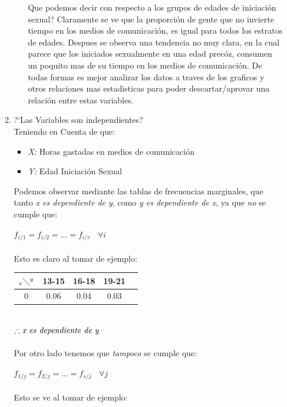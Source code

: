 \documentclass[letterpaper,spanish,11pt]{article}
\begin{document}
\begin{itemize}
\begin{enumerate}
\begin{enumerate}
Que podemos decir con respecto a los grupos de edades de iniciaci\'on sexual? Claramente se ve que la proporci\'on de gente que no invierte tiempo en los medios de comunicaci\'on, es igual para todos los estratos de edades. Despues se observa una tendencia no muy clara, en la cual parece que los iniciados sexualmente en una edad prec\'oz, consumen un poquito mas de su tiempo en los medios de comunicaci\'on. De todas formas es mejor analizar los datos a traves de los graficos y otros relaciones mas estadisticas para poder descartar/aprovar una relaci\'on entre estas variables.

\end{enumerate}

\item ?`Las Variables son independientes?\\
	Teniendo en Cuenta de que:\\
	\begin{itemize}
		\item \emph{X:} Horas gastadas en medios de comunicaci\'on
		\item \emph{Y:} Edad Iniciaci\'on Sexual
	\end{itemize}
	Podemos observar mediante las tablas de frecuencias marginales, que tanto \emph{x es dependiente de y}, como \emph{y es dependiente de x}, ya que \emph{no} se cumple que:

	$f_{i/1} = f_{i/2} = ... = f_{i/r} \ \ \ \ \forall i $\\ \\
	Esto es claro al tomar de ejemplo: \\
	
	\begin{tabular}[c]{|c|c c c|c|}                           	
	\hline
	$_x\diagdown ^{y}$ & 13-15 & 16-18 & 19-21 \\
	\hline
	0 & 0.06 & 0.04 & 0.03 \\
	\hline
	\end{tabular} \\

	$\therefore \emph{x es dependiente de y}$ \\ \\
	Por otro lado tenemos que \emph{tampoco} se cumple que:

 	$f_{1/j} = f_{2/j} = ... = f_{s/j} \ \ \ \ \forall j $\\ \\

	Esto se ve al tomar de ejemplo: \\


\end{enumerate}
\end{itemize}
\end{document}
